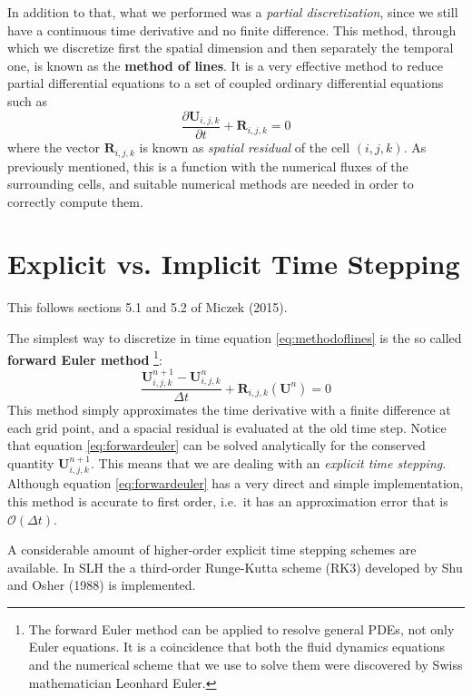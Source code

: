 In addition to that, what we performed was a \textit{partial discretization}, since we still have a continuous time derivative and no finite difference. This method, through which we discretize first the spatial dimension and then separately the temporal one, is known as the \textbf{method of lines}. It is a very effective method to reduce partial differential equations to a set of coupled ordinary differential equations such as
\begin{equation}\label{eq:methodoflines}
	\frac{\partial \mathbf{U}_{i, j, k}}{\partial t} + \mathbf{R}_{i, j, k}=0
\end{equation}
where the vector $\mathbf{R}_{i, j, k}$ is known as \textit{spatial residual} of the cell $(i, j, k)$. As previously mentioned, this is a function with the numerical fluxes of the surrounding cells, and suitable numerical methods are needed in order to correctly compute them.
\section{Explicit vs. Implicit Time Stepping}
This follows sections 5.1 and 5.2 of Miczek (2015).

The simplest way to discretize in time equation \ref{eq:methodoflines} is the so called \textbf{forward Euler method} \footnote{The forward Euler method can be applied to resolve general PDEs, not only Euler equations. It is a coincidence that both the fluid dynamics equations and the numerical scheme that we use to solve them were discovered by Swiss mathematician Leonhard Euler.}:
\begin{equation}\label{eq:forwardeuler}
	\frac{\mathbf{U}^{n+1}_{i, j, k} - \mathbf{U}^{n}_{i, j, k}}{\Delta t} + \mathbf{R}_{i, j, k}(\mathbf{U}^n)=0
\end{equation}
This method simply approximates the time derivative with a finite difference at each grid point, and a spacial residual is evaluated at the old time step. Notice that equation \ref{eq:forwardeuler} can be solved analytically for the conserved quantity $\mathbf{U}^{n+1}_{i, j, k}$. This means that we are dealing with an \textit{explicit time stepping}. Although equation \ref{eq:forwardeuler} has a very direct and simple implementation, this method is accurate to first order, i.e.\ it has an approximation error that is $\mathcal{O}(\Delta t)$.

A considerable amount of higher-order explicit time stepping schemes are available. In SLH the a third-order Runge-Kutta scheme (RK3) developed by Shu and Osher (1988) is implemented. 

